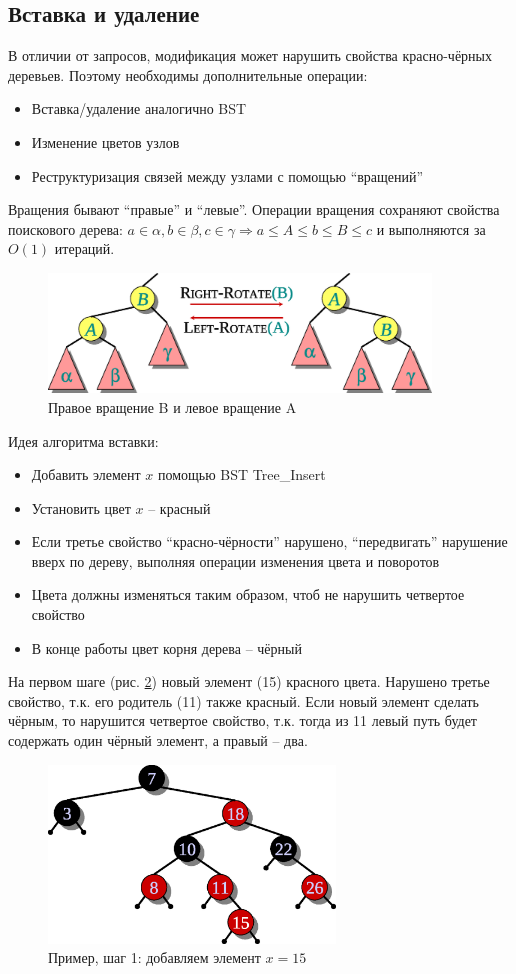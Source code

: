 \documentclass[11pt]{article}
\begin{document}
\subsection{Вставка и удаление}
В отличии от запросов, модификация может нарушить свойства красно-чёрных деревьев. Поэтому необходимы дополнительные операции:
\begin{itemize}
\item Вставка/удаление аналогично BST
\item Изменение цветов узлов
\item Реструктуризация связей между узлами с помощью ``вращений''
\end{itemize}
Вращения бывают ``правые'' и ``левые''. Операции вращения сохраняют свойства поискового дерева: $a \in \alpha, b \in \beta, c \in \gamma \Rightarrow a \leqslant A \leqslant b \leqslant B \leqslant c$ и выполняются за $O(1)$ итераций.
\begin{figure}[ht]
  \centering
  \includegraphics[width=4in]{lecture10/rotations.eps}
  \caption{Правое вращение B и левое вращение A}
  \label{fig:rotations}
\end{figure}
Идея алгоритма вставки:
\begin{itemize}
\item Добавить элемент $x$ помощью BST Tree\_Insert
\item Установить цвет $x$ -- красный
\item Если третье свойство ``красно-чёрности'' нарушено, ``передвигать'' нарушение вверх по дереву, выполняя операции изменения цвета и поворотов
\item Цвета должны изменяться таким образом, чтоб не нарушить четвертое свойство
\item В конце работы цвет корня дерева -- чёрный
\end{itemize}
На первом шаге (рис. \ref{fig:example1}) новый элемент (15) красного цвета. Нарушено третье свойство, т.к. его родитель (11) также красный. Если новый элемент сделать чёрным, то нарушится четвертое свойство, т.к. тогда из 11 левый путь будет содержать один чёрный элемент, а правый -- два.
\begin{figure}[h!]
  \centering
  \includegraphics[width=3in]{lecture10/example1.eps}
  \caption{Пример, шаг 1: добавляем элемент $x=15$}
  \label{fig:example1}
\end{figure}
\end{document}

